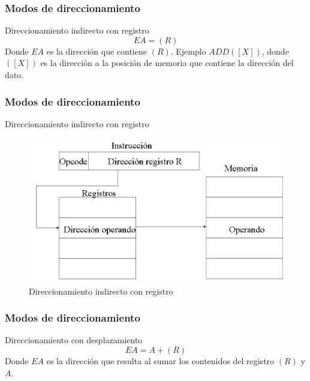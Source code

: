 \documentclass{beamer}
\begin{document}
\begin{frame}
	\frametitle{Modos de direccionamiento}
	\begin{block}{Direccionamiento indirecto con registro} \justify
		\begin{equation}
			EA = (R)
		\end{equation}
		Donde $EA$ es la dirección que contiene $(R)$. Ejemplo $ADD ([X])$, donde $([X])$ es la dirección a la posición de memoria que contiene la dirección del dato.
	\end{block}		 		
\end{frame}


\begin{frame}
	\frametitle{Modos de direccionamiento}
	\begin{block}{Direccionamiento indirecto con registro}
	\begin{figure}[H]
	\centering
	\includegraphics[scale=0.4]{imagenes/indirectoRegistro.jpg}
	\caption{Direccionamiento indirecto con registro}
	\end{figure}			
	\end{block}		 		
\end{frame}%


\begin{frame}
	\frametitle{Modos de direccionamiento}
	\begin{block}{Direccionamiento con desplazamiento} \justify
		\begin{equation}
			EA = A + (R)
		\end{equation}
		Donde $EA$ es la dirección que resulta al sumar los contenidos del registro $(R)$ y $A$.
	\end{block}		 		
\end{frame}
\end{document}
